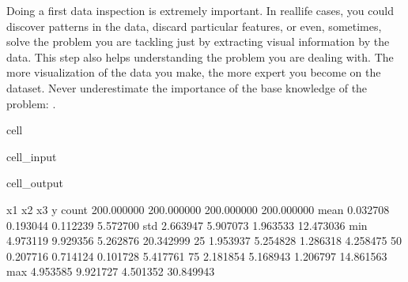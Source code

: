 \documentclass[letterpaper,10pt,english]{jupyterBook}
\begin{document}
\begin{sphinxShadowBox}
\sphinxstylesidebartitle{}

\sphinxAtStartPar
Doing a first data inspection is extremely important. In real\sphinxhyphen{}life cases, you could discover patterns in the data, discard particular features, or even, sometimes, solve the problem you are tackling just by extracting visual information by the data. This step also helps understanding the problem you are dealing with. The more visualization of the data you make, the more expert you become on the dataset. Never underestimate the importance of the base knowledge of the problem: .
\end{sphinxShadowBox}

\begin{sphinxuseclass}{cell}\begin{sphinxVerbatimInput}

\begin{sphinxuseclass}{cell_input}
\begin{sphinxVerbatim}[commandchars=\\\{\}]
  
 
\end{sphinxVerbatim}

\end{sphinxuseclass}\end{sphinxVerbatimInput}
\begin{sphinxVerbatimOutput}

\begin{sphinxuseclass}{cell_output}
\begin{sphinxVerbatim}[commandchars=\\\{\}]
               x1          x2          x3           y
count  200.000000  200.000000  200.000000  200.000000
mean     0.032708   \PYGZhy{}0.193044   \PYGZhy{}0.112239    5.572700
std      2.663947    5.907073    1.963533   12.473036
min     \PYGZhy{}4.973119   \PYGZhy{}9.929356   \PYGZhy{}5.262876  \PYGZhy{}20.342999
25\PYGZpc{}     \PYGZhy{}1.953937   \PYGZhy{}5.254828   \PYGZhy{}1.286318   \PYGZhy{}4.258475
50\PYGZpc{}      0.207716   \PYGZhy{}0.714124   \PYGZhy{}0.101728    5.417761
75\PYGZpc{}      2.181854    5.168943    1.206797   14.861563
max      4.953585    9.921727    4.501352   30.849943
\end{sphinxVerbatim}


\end{sphinxuseclass}
\end{sphinxVerbatimOutput}
\end{sphinxuseclass}
\end{document}
